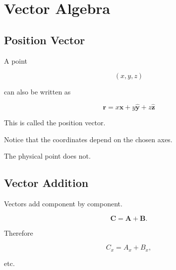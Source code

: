 \section{Vector Algebra}
\label{sec:vector-algebra}

\subsection{Position Vector}

A point

\[
(x,y,z)
\]

can also be written as

\[
\boxed{
	\mathbf r
	=
	x\hat{\mathbf x}
	+
	y\hat{\mathbf y}
	+
	z\hat{\mathbf z}
}
\]

This is called the position vector.

Notice that the coordinates depend on the chosen axes.

The physical point does not.


\subsection{Vector Addition}

Vectors add component by component.

\[
\mathbf C
=
\mathbf A+\mathbf B.
\]

Therefore

\[
C_x=A_x+B_x,
\]

etc.

